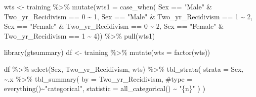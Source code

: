 \documentclass[
  letterpaper,
  DIV=11,
  numbers=noendperiod]{scrreprt}
\newenvironment{Shaded}{\begin{snugshade}}{\end{snugshade}}
\newcommand{\AttributeTok}[1]{\textcolor[rgb]{0.40,0.45,0.13}{#1}}
\newcommand{\CommentTok}[1]{\textcolor[rgb]{0.37,0.37,0.37}{#1}}
\newcommand{\DecValTok}[1]{\textcolor[rgb]{0.68,0.00,0.00}{#1}}
\newcommand{\FunctionTok}[1]{\textcolor[rgb]{0.28,0.35,0.67}{#1}}
\newcommand{\NormalTok}[1]{\textcolor[rgb]{0.00,0.23,0.31}{#1}}
\newcommand{\OtherTok}[1]{\textcolor[rgb]{0.00,0.23,0.31}{#1}}
\newcommand{\SpecialCharTok}[1]{\textcolor[rgb]{0.37,0.37,0.37}{#1}}
\newcommand{\StringTok}[1]{\textcolor[rgb]{0.13,0.47,0.30}{#1}}
\begin{document}
\begin{Shaded}
\begin{Highlighting}[]
\NormalTok{wts }\OtherTok{\textless{}{-}}\NormalTok{ training }\SpecialCharTok{\%\textgreater{}\%}  
  \FunctionTok{mutate}\NormalTok{(}\AttributeTok{wts1 =} \FunctionTok{case\_when}\NormalTok{(}
\NormalTok{    Sex }\SpecialCharTok{==} \StringTok{"Male"} \SpecialCharTok{\&}\NormalTok{ Two\_yr\_Recidivism }\SpecialCharTok{==} \DecValTok{0} \SpecialCharTok{\textasciitilde{}} \DecValTok{1}\NormalTok{,}
\NormalTok{    Sex }\SpecialCharTok{==} \StringTok{"Male"} \SpecialCharTok{\&}\NormalTok{ Two\_yr\_Recidivism }\SpecialCharTok{==} \DecValTok{1} \SpecialCharTok{\textasciitilde{}} \DecValTok{2}\NormalTok{, }
\NormalTok{    Sex }\SpecialCharTok{==} \StringTok{"Female"} \SpecialCharTok{\&}\NormalTok{ Two\_yr\_Recidivism }\SpecialCharTok{==} \DecValTok{0} \SpecialCharTok{\textasciitilde{}} \DecValTok{2}\NormalTok{,}
\NormalTok{    Sex }\SpecialCharTok{==} \StringTok{"Female"} \SpecialCharTok{\&}\NormalTok{ Two\_yr\_Recidivism }\SpecialCharTok{==} \DecValTok{1} \SpecialCharTok{\textasciitilde{}} \DecValTok{4}\NormalTok{)) }\SpecialCharTok{\%\textgreater{}\%} 
    \FunctionTok{pull}\NormalTok{(wts1)}

\FunctionTok{library}\NormalTok{(gtsummary)}
\NormalTok{df }\OtherTok{\textless{}{-}}\NormalTok{ training }\SpecialCharTok{\%\textgreater{}\%} 
  \FunctionTok{mutate}\NormalTok{(}\AttributeTok{wts =} \FunctionTok{factor}\NormalTok{(wts))}

\NormalTok{df }\SpecialCharTok{\%\textgreater{}\%}  
  \FunctionTok{select}\NormalTok{(Sex, Two\_yr\_Recidivism, wts) }\SpecialCharTok{\%\textgreater{}\%} 
 \FunctionTok{tbl\_strata}\NormalTok{(}
    \AttributeTok{strata =}\NormalTok{ Sex,}
    \SpecialCharTok{\textasciitilde{}}\NormalTok{.x }\SpecialCharTok{\%\textgreater{}\%}
      \FunctionTok{tbl\_summary}\NormalTok{(}
        \AttributeTok{by =}\NormalTok{ Two\_yr\_Recidivism, }
        \CommentTok{\#type = everything()\textasciitilde{}"categorical", }
        \AttributeTok{statistic =} \FunctionTok{all\_categorical}\NormalTok{() }\SpecialCharTok{\textasciitilde{}} \StringTok{"\{n\}"}
\NormalTok{      )}
\NormalTok{  )}
\end{Highlighting}
\end{Shaded}
\end{document}
